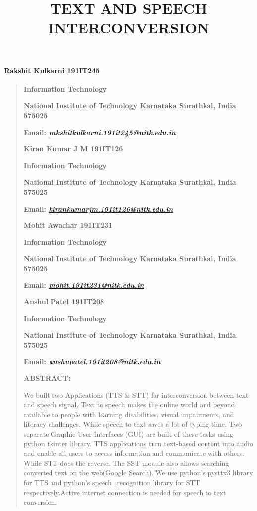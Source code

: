 \documentclass[]{article}
\date{}
\let\oldparagraph\paragraph
\renewcommand{\paragraph}[1]{\oldparagraph{#1}\mbox{}}
\begin{document}
\title{TEXT AND SPEECH INTERCONVERSION}
\maketitle
\paragraph{Rakshit Kulkarni 191IT245}\label{rakshit-kulkarni-191it245}

\begin{quote}
\textbf{Information Technology}

\textbf{National Institute of Technology Karnataka Surathkal, India
575025}

\textbf{Email:
\href{mailto:rakshitkulkarni.191it245@nitk.edu.in}{\emph{rakshitkulkarni.191it245@nitk.edu.in}}}

\textbf{Kiran Kumar J M 191IT126}

\textbf{Information Technology}

\textbf{National Institute of Technology Karnataka Surathkal, India
575025}

\textbf{Email:
\href{mailto:kirankumarjm.191it126@nitk.edu.in}{\emph{kirankumarjm.191it126@nitk.edu.in}}}

\textbf{Mohit Awachar 191IT231}

\textbf{Information Technology}

\textbf{National Institute of Technology Karnataka Surathkal, India
575025}

\textbf{Email:
\href{http://mohit.191it231@nitk.edu.in/}{\emph{mohit.191it231@nitk.edu.in}}}

\textbf{Anshul Patel 191IT208}

\textbf{Information Technology}

\textbf{National Institute of Technology Karnataka Surathkal, India
575025}

\textbf{Email:
\href{mailto:anshupatel.191it208@nitk.edu.in}{\emph{anshupatel.191it208@nitk.edu.in}}}

\textbf{ABSTRACT:}

We built two Applications (TTS \& STT) for interconversion between text
and speech signal. Text to speech makes the online world and beyond
available to people with learning disabilities, visual impairments, and
literacy challenges. While speech to text saves a lot of typing time.
Two separate Graphic User Interfaces (GUI) are built of these tasks
using python tkinter library. TTS applications turn text-based content
into audio and enable all users to access information and communicate
with others. While STT does the reverse. The SST module also allows
searching converted text on the web(Google Search). We use python's
pysttx3 library for TTS and python's speech\_recognition library for STT
respectively.Active internet connection is needed for speech to text
conversion.
\end{quote}
\end{document}
